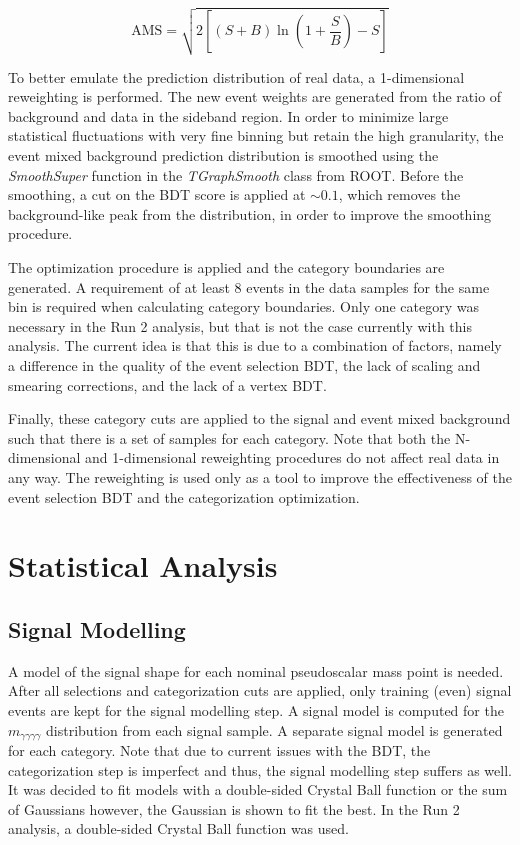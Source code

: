\documentclass[12pt]{article}
\begin{document}
\begin{equation} \label{eqn:ams}
\text{AMS} = \sqrt{2 \left[ (S + B) \ln \left(1 + \frac{S}{B}\right) - S \right]}
\end{equation}

To better emulate the prediction distribution of real data, a 1-dimensional reweighting is performed. The new event weights are generated from the ratio of background and data in the sideband region. In order to minimize large statistical fluctuations with very fine binning but retain the high granularity, the event mixed background prediction distribution is smoothed using the \textit{SmoothSuper} function in the \textit{TGraphSmooth} class from ROOT. Before the smoothing, a cut on the BDT score is applied at $\sim 0.1$, which removes the background-like peak from the distribution, in order to improve the smoothing procedure.\par

The optimization procedure is applied and the category boundaries are generated. A requirement of at least 8 events in the data samples for the same bin is required when calculating category boundaries. Only one category was necessary in the Run 2 analysis, but that is not the case currently with this analysis. The current idea is that this is due to a combination of factors, namely a difference in the quality of the event selection BDT, the lack of scaling and smearing corrections, and the lack of a vertex BDT.\par

Finally, these category cuts are applied to the signal and event mixed background such that there is a set of samples for each category. Note that both the N-dimensional and 1-dimensional reweighting procedures do not affect real data in any way. The reweighting is used only as a tool to improve the effectiveness of the event selection BDT and the categorization optimization.\par


\section{Statistical Analysis}
\subsection{Signal Modelling} \label{sec:sig-mod}
A model of the signal shape for each nominal pseudoscalar mass point is needed. After all selections and categorization cuts are applied, only training (even) signal events are kept for the signal modelling step. A signal model is computed for the $m_{\gamma \gamma \gamma \gamma}$ distribution from each signal sample. A separate signal model is generated for each category. Note that due to current issues with the BDT, the categorization step is imperfect and thus, the signal modelling step suffers as well. It was decided to fit models with a double-sided Crystal Ball function or the sum of Gaussians however, the Gaussian is shown to fit the best. In the Run 2 analysis, a double-sided Crystal Ball function was used.\par
\end{document}
